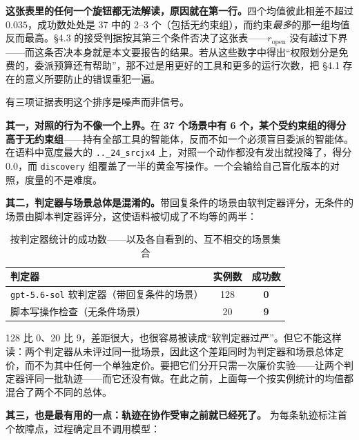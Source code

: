 \documentclass[UTF8,11pt,fontset=fandol]{ctexart}
\begin{document}
\textbf{这张表里的任何一个旋钮都无法解读，原因就在第一行。}四个均值彼此相差不超过 $0.035$，成功数处处是 37 中的 2--3 个（包括无约束组），而约束\emph{最多}的那一组均值反而最高。\S4.3 的接受判据按其第三个条件否决了这张表——$r_{\mathrm{open}}$ 没有越过下界——而这条否决本身就是本文要报告的结果。若从这些数字中得出“权限划分是免费的，委派预算还有帮助”，那不过是用更好的工具和更多的运行次数，把 \S4.1 存在的意义所要防止的错误重犯一遍。

有三项证据表明这个排序是噪声而非信号。

\textbf{其一，对照的行为不像一个上界。}在 \textbf{37 个场景中有 6 个，某个受约束组的得分高于无约束组}——持有全部工具的智能体，反而不如一个必须盲目委派的智能体。在语料中宽度最大的 \texttt{..\_24\_srcjx4} 上，对照一个动作都没有发出就投降了，得分 $0.0$，而 \texttt{discovery} 组覆盖了一半的黄金写操作。一个会输给自己盲化版本的对照，度量的不是难度。

\textbf{其二，判定器与场景总体是混淆的。}带回复条件的场景由软判定器评分，无条件的场景由脚本判定器评分，这使语料被切成了不均等的两半：

\begin{table}[H]
\centering
\small
\caption{按判定器统计的成功数——以及各自看到的、互不相交的场景集合}
\label{tab:judges}
\begin{tabularx}{\textwidth}{X c c}
\toprule
判定器 & 实例数 & 成功数\\
\midrule
\texttt{gpt-5.6-sol} 软判定器（带回复条件的场景） & 128 & \textbf{0}\\
脚本写操作检查（无条件场景） & 20 & \textbf{9}\\
\bottomrule
\end{tabularx}
\end{table}

128 比 0、20 比 9，差距很大，也很容易被读成“软判定器过严”。但它不能这样读：两个判定器从未评过同一批场景，因此这个差距同时为判定器和场景总体定价，而不为其中任何一个单独定价。要把它们分开只需一次廉价实验——让两个判定器评同一批轨迹——而它还没有做。在此之前，上面每一个按实例统计的均值都混合了两个不同的总体。

\textbf{其三，也是最有用的一点：轨迹在协作受审之前就已经死了。} 为每条轨迹标注首个故障点，过程确定且不调用模型：
\end{document}
